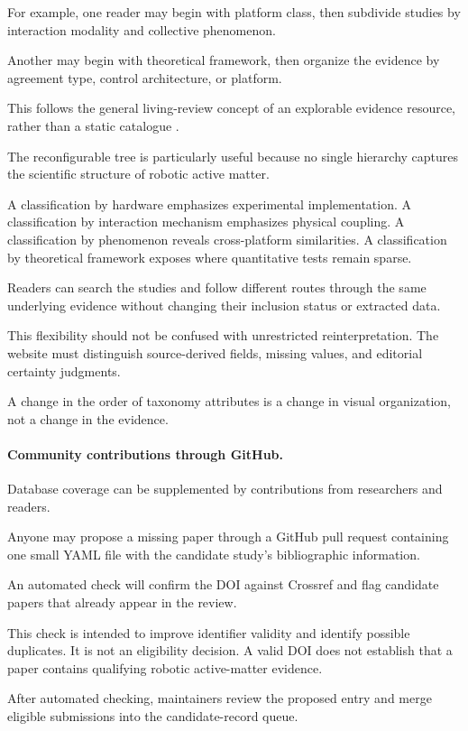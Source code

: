 For example, one reader may
begin with platform class,
then subdivide studies
by interaction modality
and collective phenomenon.

Another may begin with
theoretical framework,
then organize the evidence
by agreement type,
control architecture,
or platform.

This follows the general
living-review concept of
an explorable evidence
resource, rather than
a static catalogue
\cite{Matl2017vascular}.

The reconfigurable tree
is particularly useful
because no single hierarchy
captures the scientific
structure of robotic
active matter.

A classification by
hardware emphasizes
experimental implementation.
A classification by
interaction mechanism
emphasizes physical coupling.
A classification by
phenomenon reveals
cross-platform similarities.
A classification by
theoretical framework
exposes where quantitative
tests remain sparse.

Readers can search the
studies and follow
different routes
through the same
underlying evidence
without changing
their inclusion status
or extracted data.

This flexibility
should not be confused
with unrestricted
reinterpretation.
The website must
distinguish source-derived
fields, missing values,
and editorial
certainty judgments.

A change in the order
of taxonomy attributes
is a change in
visual organization,
not a change
in the evidence.

\paragraph*{Community contributions through GitHub.}

Database coverage can be supplemented
by contributions from researchers
and readers.

Anyone may propose a missing paper
through a GitHub pull request
containing one small YAML file
with the candidate study's
bibliographic information.

An automated check will confirm
the DOI against Crossref
and flag candidate papers
that already appear
in the review.

This check is intended
to improve identifier
validity and identify
possible duplicates.
It is not an
eligibility decision.
A valid DOI does
not establish that
a paper contains
qualifying robotic
active-matter evidence.

After automated checking,
maintainers review
the proposed entry
and merge eligible
submissions into
the candidate-record
queue.

